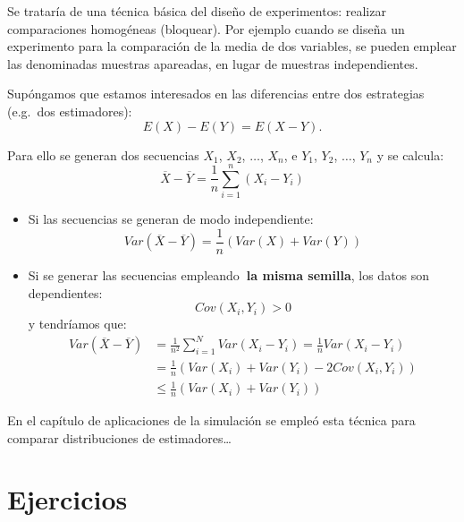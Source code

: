 \documentclass[
]{book}
\theoremstyle{break}
\theoremstyle{nonumberplain}
\begin{document}
Se trataría de una técnica básica del diseño de experimentos:
realizar comparaciones homogéneas (bloquear).
Por ejemplo cuando se diseña un experimento para la comparación
de la media de dos variables, se pueden emplear las denominadas
muestras apareadas, en lugar de muestras independientes.

Supóngamos que estamos interesados en las diferencias entre dos
estrategias (e.g.~dos estimadores):
\[E\left(  X\right)  -E\left(  Y\right)  =E\left(  X-Y\right).\]

Para ello se generan dos secuencias \(X_{1}\), \(X_{2}\), \(\ldots\),
\(X_{n}\), e \(Y_{1}\), \(Y_{2}\), \(\ldots\), \(Y_{n}\) y se calcula:
\[\overline{X}-\overline{Y}=\frac{1}{n}\sum_{i=1}^{n}\left(  X_{i}-Y_{i}\right)\]

\begin{itemize}
\item
  Si las secuencias se generan de modo independiente:
  \[Var\left( \overline{X} - \overline{Y} \right) 
  = \frac{1}{n} \left( Var\left( X \right) + Var\left( Y \right) \right)\]
\item
  Si se generar las secuencias empleando\textbf{~la misma semilla},
  los datos son dependientes:
  \[Cov\left( X_{i}, Y_{i} \right) > 0\]
  y tendríamos que:
  \[\begin{aligned}
  Var\left( \overline{X}-\overline{Y}\right)  &
  = \frac{1}{n^{2}}\sum_{i=1}^{N}Var\left( X_{i}-Y_{i}\right) 
  = \frac{1}{n}Var\left( X_{i}-Y_{i}\right) \\
  & = \frac{1}{n}\left( Var\left( X_{i} \right) + Var\left( Y_{i} \right)
  - 2Cov\left( X_{i},Y_{i} \right) \right) \\
  & \leq \frac{1}{n}\left( Var\left( X_{i} \right) 
  + Var\left( Y_{i}\right) \right)
  \end{aligned}\]
\end{itemize}

En el capítulo de aplicaciones de la simulación se empleó esta técnica para comparar distribuciones de estimadores\ldots{}

\hypertarget{ejercicios-2}{%
\section{Ejercicios}\label{ejercicios-2}}
\end{document}
